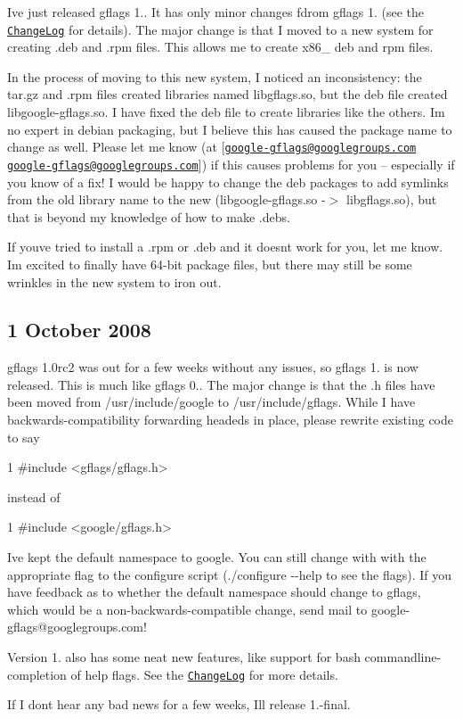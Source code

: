 I\textquotesingle{}ve just released gflags 1.. It has only minor changes fdrom gflags 1. (see the \href{ChangeLog.txt}{\tt Change\+Log} for details). The major change is that I moved to a new system for creating .deb and .rpm files. This allows me to create x86\+\_ deb and rpm files.

In the process of moving to this new system, I noticed an inconsistency\+: the tar.\+gz and .rpm files created libraries named libgflags.\+so, but the deb file created libgoogle-\/gflags.\+so. I have fixed the deb file to create libraries like the others. I\textquotesingle{}m no expert in debian packaging, but I believe this has caused the package name to change as well. Please let me know (at \mbox{[}\href{mailto:google-gflags@googlegroups.com}{\tt google-\/gflags@googlegroups.\+com} \href{mailto:google-gflags@googlegroups.com}{\tt google-\/gflags@googlegroups.\+com}\mbox{]}) if this causes problems for you -- especially if you know of a fix! I would be happy to change the deb packages to add symlinks from the old library name to the new (libgoogle-\/gflags.\+so -\/$>$ libgflags.\+so), but that is beyond my knowledge of how to make .debs.

If you\textquotesingle{}ve tried to install a .rpm or .deb and it doesn\textquotesingle{}t work for you, let me know. I\textquotesingle{}m excited to finally have 64-\/bit package files, but there may still be some wrinkles in the new system to iron out.

\subsection*{1 October 2008 }

gflags 1.\+0rc2 was out for a few weeks without any issues, so gflags 1. is now released. This is much like gflags 0.. The major change is that the .h files have been moved from {\ttfamily /usr/include/google} to {\ttfamily /usr/include/gflags}. While I have backwards-\/compatibility forwarding headeds in place, please rewrite existing code to say 
\begin{DoxyCode}
1 #include <gflags/gflags.h>
\end{DoxyCode}
 instead of 
\begin{DoxyCode}
1 #include <google/gflags.h>
\end{DoxyCode}


I\textquotesingle{}ve kept the default namespace to google. You can still change with with the appropriate flag to the configure script ({\ttfamily ./configure -\/-\/help} to see the flags). If you have feedback as to whether the default namespace should change to gflags, which would be a non-\/backwards-\/compatible change, send mail to {\ttfamily google-\/gflags@googlegroups.\+com}!

Version 1. also has some neat new features, like support for bash commandline-\/completion of help flags. See the \href{ChangeLog.txt}{\tt Change\+Log} for more details.

If I don\textquotesingle{}t hear any bad news for a few weeks, I\textquotesingle{}ll release 1.-\/final. 